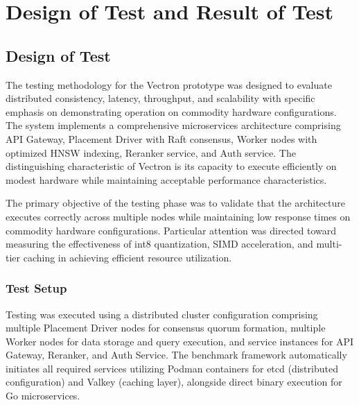 \chapter{Design of Test and Result of Test}

\section{Design of Test}

The testing methodology for the Vectron prototype was designed to evaluate distributed consistency, latency, throughput, and scalability with specific emphasis on demonstrating operation on commodity hardware configurations. The system implements a comprehensive microservices architecture comprising API Gateway, Placement Driver with Raft consensus, Worker nodes with optimized HNSW indexing, Reranker service, and Auth service. The distinguishing characteristic of Vectron is its capacity to execute efficiently on modest hardware while maintaining acceptable performance characteristics.

The primary objective of the testing phase was to validate that the architecture executes correctly across multiple nodes while maintaining low response times on commodity hardware configurations. Particular attention was directed toward measuring the effectiveness of int8 quantization, SIMD acceleration, and multi-tier caching in achieving efficient resource utilization.

\subsection{Test Setup}

Testing was executed using a distributed cluster configuration comprising multiple Placement Driver nodes for consensus quorum formation, multiple Worker nodes for data storage and query execution, and service instances for API Gateway, Reranker, and Auth Service. The benchmark framework automatically initiates all required services utilizing Podman containers for etcd (distributed configuration) and Valkey (caching layer), alongside direct binary execution for Go microservices.

